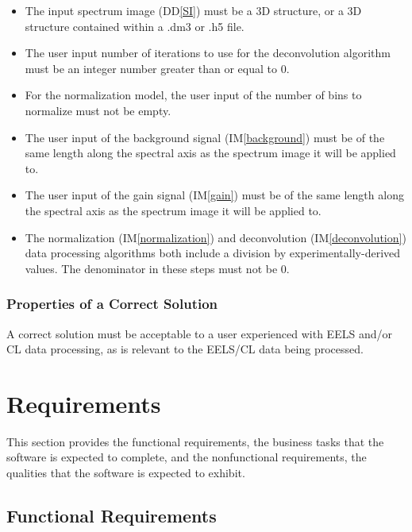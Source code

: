 \documentclass[12pt]{article}
\newcommand{\ddref}[1]{DD\ref{#1}}
\newcommand{\iref}[1]{IM\ref{#1}}
\begin{document}
\begin{itemize}
	\item The input spectrum image (\ddref{SI}) must be a 3D structure, or a 3D
structure contained within a .dm3 or .h5 file.
	\item The user input number of iterations to use for the deconvolution
algorithm must be an integer number greater than or equal to 0.
	\item For the normalization model, the user input of the number of bins to
normalize must not be empty.
	\item The user input of the background signal (\iref{background}) must be of
the same length along the spectral axis as the spectrum image it will be applied
to.
	\item The user input of the gain signal (\iref{gain}) must be of the same
length along the spectral axis as the spectrum image it will be applied to.
	\item The normalization ({\iref{normalization}}) and deconvolution
({\iref{deconvolution}}) data processing algorithms both include a division by
experimentally-derived values. The denominator in these steps must not be 0.
\end{itemize}

\subsubsection{Properties of a Correct Solution} \label{sec_CorrectSolution}

\noindent
A correct solution must be acceptable to a user experienced with EELS and/or CL
data processing, as is relevant to the EELS/CL data being processed.

\section{Requirements}

This section provides the functional requirements, the business tasks that the
software is expected to complete, and the nonfunctional requirements, the
qualities that the software is expected to exhibit.

\subsection{Functional Requirements}
\label{subsec:FR}
\end{document}
